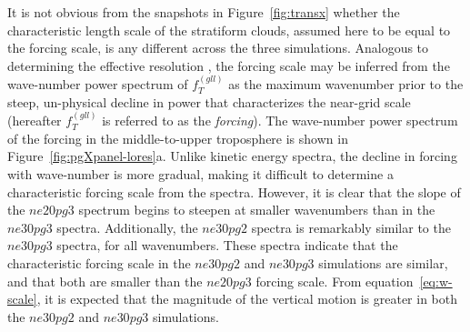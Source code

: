 \documentclass{agujournal}
\begin{document}
It is not obvious from the snapshots in Figure~\ref{fig:transx} whether the characteristic length scale of the stratiform clouds, assumed here to be equal to the forcing scale, is any different across the three simulations. Analogous to determining the effective resolution \citep{S2011LNCSE}, the forcing scale may be inferred from the wave-number power spectrum of $f_T^{(gll)}$ as the maximum wavenumber prior to the steep, un-physical decline in power that characterizes the near-grid scale (hereafter $f_T^{(gll)}$ is referred to as the {\em{forcing}}). The wave-number power spectrum of the forcing in the middle-to-upper troposphere is shown in Figure~\ref{fig:pgXpanel-lores}a. Unlike kinetic energy spectra, the decline in forcing with wave-number is more gradual, making it difficult to determine a characteristic forcing scale from the spectra. However, it is clear that the slope of the $ne20pg3$ spectrum begins to steepen at smaller wavenumbers than in the $ne30pg3$ spectra. Additionally, the $ne30pg2$ spectra is remarkably similar to the $ne30pg3$ spectra, for all wavenumbers. These spectra indicate that the characteristic forcing scale in the $ne30pg2$ and $ne30pg3$ simulations are similar, and that both are smaller than the $ne20pg3$ forcing scale. From equation~\ref{eq:w-scale}, it is expected that the magnitude of the vertical motion is greater in both the $ne30pg2$ and $ne30pg3$ simulations.
\end{document}
